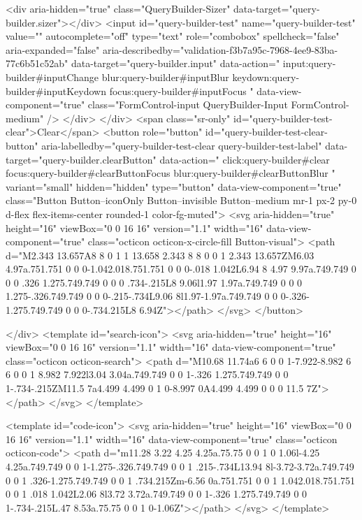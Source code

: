             <div aria-hidden="true" class="QueryBuilder-Sizer" data-target="query-builder.sizer"></div>
            <input id="query-builder-test" name="query-builder-test" value="" autocomplete="off" type="text" role="combobox" spellcheck="false" aria-expanded="false" aria-describedby="validation-f3b7a95c-7968-4ee9-83ba-77c6b51c52ab" data-target="query-builder.input" data-action="
          input:query-builder#inputChange
          blur:query-builder#inputBlur
          keydown:query-builder#inputKeydown
          focus:query-builder#inputFocus
        " data-view-component="true" class="FormControl-input QueryBuilder-Input FormControl-medium" />
          </div>
        </div>
          <span class="sr-only" id="query-builder-test-clear">Clear</span>
          <button role="button" id="query-builder-test-clear-button" aria-labelledby="query-builder-test-clear query-builder-test-label" data-target="query-builder.clearButton" data-action="
                click:query-builder#clear
                focus:query-builder#clearButtonFocus
                blur:query-builder#clearButtonBlur
              " variant="small" hidden="hidden" type="button" data-view-component="true" class="Button Button--iconOnly Button--invisible Button--medium mr-1 px-2 py-0 d-flex flex-items-center rounded-1 color-fg-muted">  <svg aria-hidden="true" height="16" viewBox="0 0 16 16" version="1.1" width="16" data-view-component="true" class="octicon octicon-x-circle-fill Button-visual">
    <path d="M2.343 13.657A8 8 0 1 1 13.658 2.343 8 8 0 0 1 2.343 13.657ZM6.03 4.97a.751.751 0 0 0-1.042.018.751.751 0 0 0-.018 1.042L6.94 8 4.97 9.97a.749.749 0 0 0 .326 1.275.749.749 0 0 0 .734-.215L8 9.06l1.97 1.97a.749.749 0 0 0 1.275-.326.749.749 0 0 0-.215-.734L9.06 8l1.97-1.97a.749.749 0 0 0-.326-1.275.749.749 0 0 0-.734.215L8 6.94Z"></path>
</svg>
</button>

      </div>
      <template id="search-icon">
  <svg aria-hidden="true" height="16" viewBox="0 0 16 16" version="1.1" width="16" data-view-component="true" class="octicon octicon-search">
    <path d="M10.68 11.74a6 6 0 0 1-7.922-8.982 6 6 0 0 1 8.982 7.922l3.04 3.04a.749.749 0 0 1-.326 1.275.749.749 0 0 1-.734-.215ZM11.5 7a4.499 4.499 0 1 0-8.997 0A4.499 4.499 0 0 0 11.5 7Z"></path>
</svg>
</template>

<template id="code-icon">
  <svg aria-hidden="true" height="16" viewBox="0 0 16 16" version="1.1" width="16" data-view-component="true" class="octicon octicon-code">
    <path d="m11.28 3.22 4.25 4.25a.75.75 0 0 1 0 1.06l-4.25 4.25a.749.749 0 0 1-1.275-.326.749.749 0 0 1 .215-.734L13.94 8l-3.72-3.72a.749.749 0 0 1 .326-1.275.749.749 0 0 1 .734.215Zm-6.56 0a.751.751 0 0 1 1.042.018.751.751 0 0 1 .018 1.042L2.06 8l3.72 3.72a.749.749 0 0 1-.326 1.275.749.749 0 0 1-.734-.215L.47 8.53a.75.75 0 0 1 0-1.06Z"></path>
</svg>
</template>

